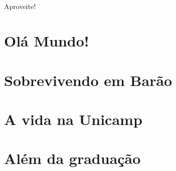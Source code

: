 \documentclass[a4paper,10pt,twocolumn]{book}
\begin{document}
\paragraph{}
Aproveite!


\tableofcontents

\mainmatter
\onecolumn

\chapter{Olá Mundo!}



\clearpage

\onecolumn



\clearpage



\clearpage

\twocolumn


\newpage

\chapter{Sobrevivendo em Barão}

\newpage

\newpage

\newpage

\newpage

\chapter{A vida na Unicamp}

\newpage

\newpage

\newpage
\chapter{Além da graduação}

\newpage

\newpage





\end{document}
